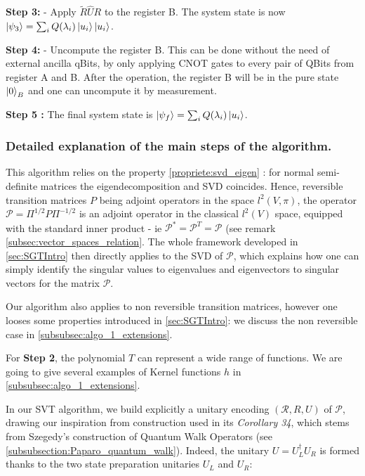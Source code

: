 \documentclass[sn-mathphys]{sn-jnl}%
\theoremstyle{thmstyleone}%
\theoremstyle{thmstyletwo}%
\theoremstyle{thmstylethree}%
\begin{document}
\textbf{Step 3:} - Apply $\widetilde{R}\widehat{U} R$ to the register
B. The system state is now
$\ket{\psi_3} = \sum_i Q(\lambda_i) \ket{u_i}\ket{u_i}$.

\textbf{Step 4:} - Uncompute the register B. This can be done without
the need of external ancilla qBits, by only applying CNOT gates to
every pair of QBits from register A and B. After the operation, the
register B will be in the pure state $\ket{0}_B$ and one can uncompute
it by measurement.

\textbf{Step 5 :} The final system state is
$\ket{\psi_f} = \sum_i Q(\lambda_i) \ket{u_i}$.

\subsubsection{Detailed explanation of the main steps of the algorithm.}\label{subsubsec:algo_1_explanation}

This algorithm relies on the property \ref{propriete:svd_eigen} : for
normal semi-definite matrices the eigendecomposition and SVD
coincides. Hence, reversible transition matrices $P$ being adjoint
operators in the space $l^2(V, \pi)$, the operator
$\mathcal{P} = \Pi^{1/2} P \Pi^{-1/2}$ is an adjoint operator in the
classical $l^2(V)$ space, equipped with the standard inner product -
ie $\mathcal{P}^* = \mathcal{P}^T = \mathcal{P}$ (see remark
\ref{subsec:vector_spaces_relation}. The whole framework developed in
\ref{sec:SGTIntro} then directly applies to the SVD of $\mathcal{P}$,
which explains how one can simply identify the singular values to
eigenvalues and eigenvectors to singular vectors for the matrix
$\mathcal{P}$.

Our algorithm also applies to non reversible transition matrices,
however one looses some properties introduced in \ref{sec:SGTIntro}:
we discuss the non reversible case in
\ref{subsubsec:algo_1_extensions}.

For \textbf{Step 2}, the polynomial $T$ can represent a wide range of
functions. We are going to give several examples of Kernel functions
$h$ in \ref{subsubsec:algo_1_extensions}.

In our SVT algorithm, we build explicitly a unitary encoding
$(\mathcal{R}, R, U)$ of $\mathcal{P}$, drawing our inspiration from
\cite{gilyen_su_low_wiebe_2019} construction used in its
\textit{Corollary 34}, which stems from Szegedy's construction of
Quantum Walk Operators (see
\ref{subsubsection:Paparo_quantum_walk}). Indeed, the unitary
$U = U_L^\dagger U_R$ is formed thanks to the two state preparation
unitaries $U_L$ and $U_R$:
\end{document}
